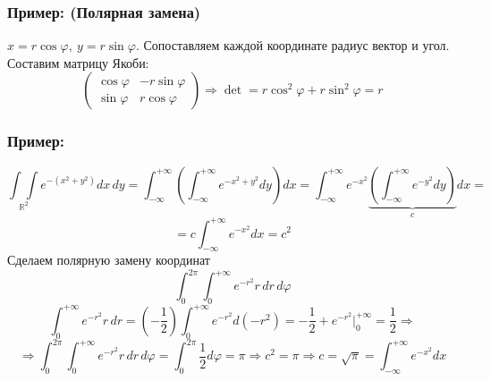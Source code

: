 \documentclass[12pt, letterpaper, twoside]{article}
\newcommand{\oo}{\infty}
\newcommand{\mb}[1]{\mathbb{#1}}
\begin{document}
    \subsubsection*{Пример: (Полярная замена)}
    $x = r\cos\varphi,\ y = r\sin \varphi$. Сопоставляем каждой координате радиус вектор и угол. Составим матрицу Якоби:
    \[\begin{pmatrix}
        \cos \varphi & -r\sin \varphi\\
        \sin \varphi & r \cos \varphi
    \end{pmatrix}\Rightarrow \det = r\cos^2 \varphi + r\sin^2 \varphi = r\]
    \subsubsection*{Пример:}
    \[\underset{\mb{R}^2}{\int\int} e^{-(x^2 + y^2)}dx\, dy = \int_{-\oo}^{+\oo} \left( \int_{-\oo}^{+\oo} e^{-x^2 + y^2} dy \right)dx = \int_{-\oo}^{+\oo}e^{-x^2} \underset{c}{\underbrace{\left(\int_{-\oo}^{+\oo} e^{-y^2} dy\right)}} dx =\]
    \[= c \int_{-\oo}^{+\oo} e^{-x^2}dx = c^2\]
    Сделаем полярную замену координат
    \[\int_0^{2\pi}\int_0^{+\oo} e^{-r^2} r\, dr\, d\varphi \]
    \[\int_0^{+\oo} e^{-r^2} r\, dr = \left(-\frac{1}{2}\right) \int_0^{+\oo} e^{-r^2} d(-r^2) = -\dfrac{1}{2} + e^{-r^2} \big|_0^{+\oo} = \dfrac{1}{2}\Rightarrow\]
    \[\Rightarrow \int_0^{2\pi}\int_0^{+\oo} e^{-r^2} r\, dr\, d\varphi = \int_{0}^{2\pi} \dfrac{1}{2} d\varphi = \pi\Rightarrow c^2 = \pi\Rightarrow c = \sqrt{\pi} = \int_{-\oo}^{+\oo} e^{-x^2}dx\]
\end{document}
